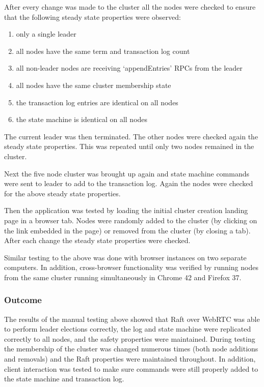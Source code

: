 \documentclass[conference,compsoc]{./IEEEtran/IEEEtran}
\begin{document}
After every change was made to the cluster all the nodes were checked
to ensure that the following steady state properties were observed:
\begin{enumerate}
\item only a single leader
\item all nodes have the same term and transaction log count
\item all non-leader nodes are receiving `appendEntries' RPCs from the leader
\item all nodes have the same cluster membership state
\item the transaction log entries are identical on all nodes
\item the state machine is identical on all nodes
\end{enumerate}

The current leader was then terminated. The other nodes were checked
again the steady state properties. This was repeated until only two
nodes remained in the cluster.

Next the five node cluster was brought up again and state machine
commands were sent to leader to add to the transaction log. Again the
nodes were checked for the above steady state properties.

Then the application was tested by loading the initial cluster
creation landing page in a browser tab. Nodes were randomly added to
the cluster (by clicking on the link embedded in the page) or removed
from the cluster (by closing a tab). After each change the steady
state properties were checked.

Similar testing to the above was done with browser instances on two
separate computers. In addition, cross-browser functionality was
verified by running nodes from the same cluster running simultaneously
in Chrome 42 and Firefox 37.


\subsubsection{Outcome}

The results of the manual testing above showed that Raft over WebRTC
was able to perform leader elections correctly, the log and state
machine were replicated correctly to all nodes, and the safety
properties were maintained. During testing the membership of the
cluster was changed numerous times (both node additions and removals)
and the Raft properties were maintained throughout. In addition,
client interaction was tested to make sure commands were still
properly added to the state machine and transaction log.
\end{document}
